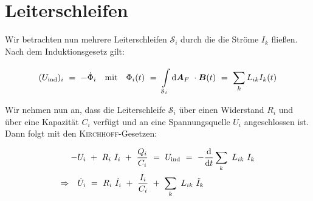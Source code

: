 \section{Leiterschleifen}

Wir betrachten nun mehrere Leiterschleifen $\mathcal{S}_i$ durch die  die Ströme $I_k$ fließen. Nach dem Induktionsgesetz gilt:

\begin{equation*}
(U_{\text{ind}})_i  \ = \ -\dot{\Phi}_i \quad \text{mit} \quad \Phi_i (t)  \ = \ \Int{\mathcal{S}_i}{}{\vec{A}_F}\cdot\vec{B}(t)  \ = \ \sum_k L_{ik} I_k(t)
\end{equation*}

Wir nehmen nun an, dass die Leiterschleife $\mathcal{S}_i$ über einen Widerstand $R_i$ und über eine Kapazität $C_i$ verfügt und an eine Spannungsquelle $U_i$ angeschlossen ist. Dann folgt mit den \textsc{Kirchhoff}-Gesetzen:

\begin{align*}
- & U_i \ + \ R_i \ I_i \ + \ \frac{Q_i}{C_i} \ = \ U_{\text{ind}}  \ = \ -\diff{}{t} \sum_k \ L_{ik} \ I_k\\
\Rightarrow \quad & \dot{U}_i  \ = \ R_i \ \dot{I}_i \ + \ \frac{I_i}{C_i} \ + \ \sum_k \ L_{ik} \ \ddot{I}_k
\end{align*}

